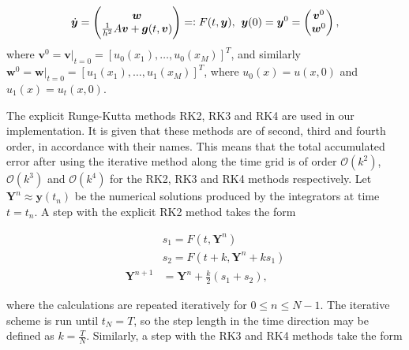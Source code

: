 \begin{equation*}
    \dot{\boldsymbol{y}} = \begin{pmatrix}
    \boldsymbol{w} \\
    \frac{1}{h^2}A\boldsymbol{v} + \boldsymbol{g}(t,\boldsymbol{v})
    \end{pmatrix} =: F(t,\boldsymbol{y}) \text{,} \hspace{2mm} \boldsymbol{y}(0) = \boldsymbol{y}^0 = \begin{pmatrix}
    \boldsymbol{v}^0\\
    \boldsymbol{w}^0
    \end{pmatrix},
\end{equation*}
where $\boldsymbol{v}^0 = \boldsymbol{v}|_{t=0} = [u_0(x_1), \ldots, u_0(x_M)]^T$, and similarly $\boldsymbol{w}^0 = \boldsymbol{w}|_{t=0} = [u_1(x_1), \ldots, u_1(x_M)]^T$, where $u_0(x) = u(x, 0)$ and $u_1(x) = u_t(x, 0)$.

The explicit Runge-Kutta methods RK2, RK3 and RK4 are used in our implementation. It is given that these methods are of second, third and fourth order, in accordance with their names. This means that the total accumulated error after using the iterative method along the time grid is of order $\mathcal{O}(k^2)$, $\mathcal{O}(k^3)$ and $\mathcal{O}(k^4)$ for the RK2, RK3 and RK4 methods respectively. Let $\boldsymbol{Y}^n \approx \boldsymbol{y}(t_n)$ be the numerical solutions produced by the integrators at time $t=t_n$. A step with the explicit RK2 method takes the form

\begin{equation*}
    \begin{split}
        &s_1 = F(t,\boldsymbol{Y}^n) \\
        &s_2 = F(t+k,\boldsymbol{Y}^n+k s_1)\\
        \boldsymbol{Y}^{n+1} &= \boldsymbol{Y}^n + \frac{k}{2}\left(s_1+s_2\right),
    \end{split}
\label{RK2-method}
\end{equation*}

\noindent where the calculations are repeated iteratively for $0 \leq n \leq N-1$. The iterative scheme is run until $t_N=T$, so the step length in the time direction may be defined as $k=\frac{T}{N}$. Similarly, a step with the RK3 and RK4 methods take the form



